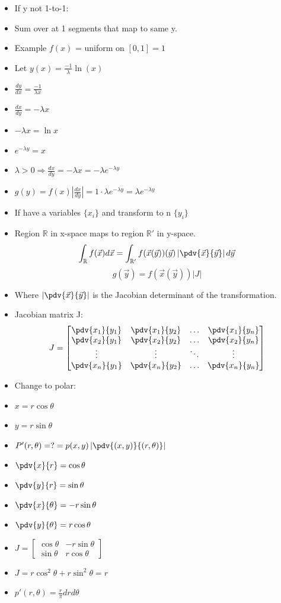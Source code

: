 \begin{itemize}
    \item If y not 1-to-1:
    \item Sum over at 1 segments that map to same y.
    \item Example $f(x)$ = uniform on $[0,1] = 1$
    \item Let $y(x) = \frac{-1}{\lambda} \ln(x)$
    \item $\frac{dy}{dx} = \frac{-1}{\lambda x}$
    \item $\frac{dx}{dy} = -\lambda x$ 
    \item $-\lambda x = \ln{x}$
    \item $e^{-\lambda y} = x$
    \item $\lambda > 0 \Rightarrow \frac{dx}{dy} = - \lambda x = -\lambda e^{-\lambda y} $
    \item $ g(y) = f(x) \left| \frac{dx}{dy} \right| = 1 \cdot \lambda e^{-\lambda y} = \lambda e^{-\lambda y}$
    \item If have a variables $\{x_i\}$ and transform to n $\{y_i\}$
    \item Region $\mathbb{R}$ in x-space maps to region $\mathbb{R'}$ in y-space.
    \[ \int_{\mathbb{R}} f(\vec{x}) d\vec{x} = \int_{\mathbb{R'}} f(\vec{x}(\vec{y}))(\vec{y}) \left|\pdv{\vec{x}}{\vec{y}} \right| d\vec{y} \]
    \[ g(\vec{y}) = f(\vec{x}(\vec{y})) \left| J \right| \]
    \item Where $\left|\pdv{\vec{x}}{\vec{y}} \right|$ is the Jacobian determinant of the transformation.
    \item Jacobian matrix J:
    \[ J = \begin{bmatrix}
        \pdv{x_1}{y_1} & \pdv{x_1}{y_2} & \ldots & \pdv{x_1}{y_n} \\
        \pdv{x_2}{y_1} & \pdv{x_2}{y_2} & \ldots & \pdv{x_2}{y_n} \\
        \vdots & \vdots & \ddots & \vdots \\
        \pdv{x_n}{y_1} & \pdv{x_n}{y_2} & \ldots & \pdv{x_n}{y_n}
    \end{bmatrix} \]
    \item Change to polar:
    \item $x = r \cos{\theta}$
    \item $y = r \sin{\theta}$
    \item $P'(r, \theta) = ? = p(x,y) \left| \pdv{(x,y)}{(r,\theta)} \right|$
    
    \item $ \pdv{x}{r} = \cos{\theta}$
    \item $ \pdv{y}{r} = \sin{\theta}$
    \item $ \pdv{x}{\theta} = -r \sin{\theta}$
    \item $ \pdv{y}{\theta} = r \cos{\theta}$
    
    \item $J = \begin{bmatrix}
        \cos{\theta} & -r \sin{\theta} \\
        \sin{\theta} & r \cos{\theta}
    \end{bmatrix}$

    \item $ J = r \cos^2{\theta} + r \sin^2{\theta} = r$
    \item $p'(r, \theta) = \frac{r}{\pi} dr d\theta$

\end{itemize}
